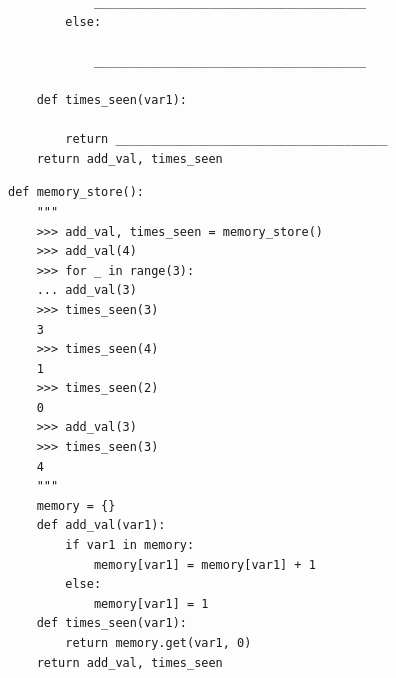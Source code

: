 \documentclass{exam}
\newlength{\currentparskip}
\newenvironment{blocksection}
{
    \setlength{\currentparskip}{\parskip}%
    \begin{minipage}{\linewidth}
    \setlength{\parskip}{\currentparskip}%
}
{
    \end{minipage}
}
\begin{document}
\begin{questions}
\begin{blocksection}
\begin{lstlisting}
            ______________________________________
        else:

            ______________________________________

    def times_seen(var1):

        return ______________________________________
    return add_val, times_seen
\end{lstlisting}
\end{blocksection}
\begin{solution}
\begin{lstlisting}
def memory_store():
    """
    >>> add_val, times_seen = memory_store()
    >>> add_val(4)
    >>> for _ in range(3):
    ... add_val(3)
    >>> times_seen(3)
    3
    >>> times_seen(4)
    1
    >>> times_seen(2)
    0
    >>> add_val(3)
    >>> times_seen(3)
    4
    """
    memory = {}
    def add_val(var1):
        if var1 in memory:
            memory[var1] = memory[var1] + 1
        else:
            memory[var1] = 1
    def times_seen(var1):
        return memory.get(var1, 0)
    return add_val, times_seen
    \end{lstlisting}
\end{solution}
\end{questions}

\newpage
\end{document}
